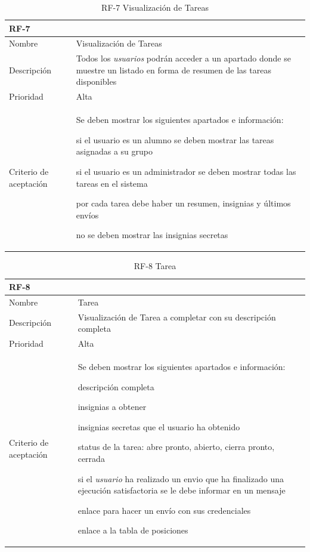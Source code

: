 \documentclass[11pt,spanish,listoffigures,listoftables]{tfgetsinf}
\begin{document}
\begin{table}[ht!]
	\centering
	\begin{tabular}{ |p{4cm}||p{10cm}|  }
		\multicolumn{2}{l}{\textbf{RF-7}} \\
		\hline
		Nombre & Visualización de Tareas \\
		\hline
		Descripción  & Todos los \textit{usuarios} podrán acceder a un apartado donde se muestre un listado en forma de resumen de las \gls{tarea}s disponibles \\
		\hline
		Prioridad &  Alta\\
		\hline
		Criterio de aceptación & Se deben mostrar los siguientes apartados e información: \newline  
		\begin{tabitem}
			\item si el usuario es un \gls{alumno} se deben mostrar las tareas asignadas a su grupo
			\item si el usuario es un \gls{administrador} se deben mostrar todas las tareas en el sistema
			\item por cada \gls{tarea} debe haber un resumen, insignias y últimos envíos
			\item no se deben mostrar las \gls{insignia}s secretas
		\end{tabitem} \\
		\hline
	\end{tabular}
	\caption{RF-7 Visualización de Tareas}
	\label{table:7}
\end{table}

\begin{table}[ht!]
	\centering
	\begin{tabular}{ |p{4cm}||p{10cm}|  }
		\multicolumn{2}{l}{\textbf{RF-8}} \\
		\hline
		Nombre & Tarea \\
		\hline
		Descripción  & Visualización de Tarea a completar con su descripción completa \\
		\hline
		Prioridad &  Alta\\
		\hline
		Criterio de aceptación & Se deben mostrar los siguientes apartados e información: \newline  
		\begin{tabitem}
			\item descripción completa
			\item \gls{insignia}s a obtener
			\item \gls{insignia}s secretas que el usuario ha obtenido
			\item status de la \gls{tarea}: abre pronto, abierto, cierra pronto, cerrada
			\item si el \textit{usuario} ha realizado un \gls{envio} que ha finalizado una ejecución satisfactoria se le debe informar en un mensaje
			\item enlace para hacer un envío con sus credenciales
			\item enlace a la tabla de posiciones
		\end{tabitem} \\
		\hline
	\end{tabular}
	\caption{RF-8 Tarea}
	\label{table:8}
\end{table}
\end{document}
